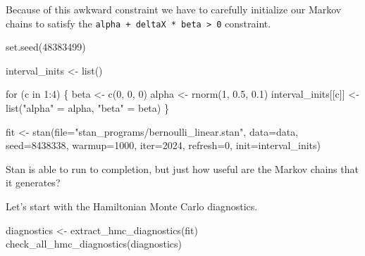 \documentclass[
  letterpaper,
  DIV=11,
  numbers=noendperiod]{scrartcl}
\newenvironment{Shaded}{\begin{snugshade}}{\end{snugshade}}
\newcommand{\AttributeTok}[1]{\textcolor[rgb]{0.40,0.45,0.13}{#1}}
\newcommand{\ControlFlowTok}[1]{\textcolor[rgb]{0.00,0.23,0.31}{#1}}
\newcommand{\DecValTok}[1]{\textcolor[rgb]{0.68,0.00,0.00}{#1}}
\newcommand{\FloatTok}[1]{\textcolor[rgb]{0.68,0.00,0.00}{#1}}
\newcommand{\FunctionTok}[1]{\textcolor[rgb]{0.28,0.35,0.67}{#1}}
\newcommand{\NormalTok}[1]{\textcolor[rgb]{0.00,0.23,0.31}{#1}}
\newcommand{\OtherTok}[1]{\textcolor[rgb]{0.00,0.23,0.31}{#1}}
\newcommand{\SpecialCharTok}[1]{\textcolor[rgb]{0.37,0.37,0.37}{#1}}
\newcommand{\StringTok}[1]{\textcolor[rgb]{0.13,0.47,0.30}{#1}}
\begin{document}
Because of this awkward constraint we have to carefully initialize our
Markov chains to satisfy the
\texttt{alpha\ +\ deltaX\ *\ beta\ \textgreater{}\ 0} constraint.

\begin{Shaded}
\begin{Highlighting}[]
\FunctionTok{set.seed}\NormalTok{(}\DecValTok{48383499}\NormalTok{)}

\NormalTok{interval\_inits }\OtherTok{\textless{}{-}} \FunctionTok{list}\NormalTok{()}

\ControlFlowTok{for}\NormalTok{ (c }\ControlFlowTok{in} \DecValTok{1}\SpecialCharTok{:}\DecValTok{4}\NormalTok{) \{}
\NormalTok{  beta }\OtherTok{\textless{}{-}} \FunctionTok{c}\NormalTok{(}\DecValTok{0}\NormalTok{, }\DecValTok{0}\NormalTok{, }\DecValTok{0}\NormalTok{)}
\NormalTok{  alpha }\OtherTok{\textless{}{-}} \FunctionTok{rnorm}\NormalTok{(}\DecValTok{1}\NormalTok{, }\FloatTok{0.5}\NormalTok{, }\FloatTok{0.1}\NormalTok{)}
\NormalTok{  interval\_inits[[c]] }\OtherTok{\textless{}{-}} \FunctionTok{list}\NormalTok{(}\StringTok{"alpha"} \OtherTok{=}\NormalTok{ alpha, }\StringTok{"beta"} \OtherTok{=}\NormalTok{ beta)}
\NormalTok{\}}

\NormalTok{fit }\OtherTok{\textless{}{-}} \FunctionTok{stan}\NormalTok{(}\AttributeTok{file=}\StringTok{"stan\_programs/bernoulli\_linear.stan"}\NormalTok{,}
            \AttributeTok{data=}\NormalTok{data, }\AttributeTok{seed=}\DecValTok{8438338}\NormalTok{,}
            \AttributeTok{warmup=}\DecValTok{1000}\NormalTok{, }\AttributeTok{iter=}\DecValTok{2024}\NormalTok{, }\AttributeTok{refresh=}\DecValTok{0}\NormalTok{,}
            \AttributeTok{init=}\NormalTok{interval\_inits)}
\end{Highlighting}
\end{Shaded}

Stan is able to run to completion, but just how useful are the Markov
chains that it generates?

Let's start with the Hamiltonian Monte Carlo diagnostics.

\begin{Shaded}
\begin{Highlighting}[]
\NormalTok{diagnostics }\OtherTok{\textless{}{-}} \FunctionTok{extract\_hmc\_diagnostics}\NormalTok{(fit)}
\FunctionTok{check\_all\_hmc\_diagnostics}\NormalTok{(diagnostics)}
\end{Highlighting}
\end{Shaded}
\end{document}
